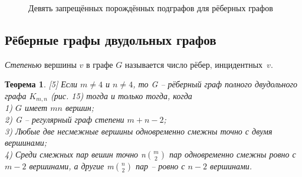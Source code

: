 \documentclass[12pt]{article}
\newtheorem{theorem}{\hspace{1cm}Теорема}
\begin{document}
\begin{figure}
	\label{pic12}
	\caption{Девять запрещённых порождённых подграфов для рёберных графов}
\end{figure}
 
\vspace{-5mm}

\begin{center}
	\subsection{Рёберные графы двудольных графов}
\end{center}

{\it Степенью} вершины $v$ в графе $G$ называется число рёбер, инцидентных~$v$.

\begin{theorem} \label{t8}[5]
	Если $m\ne4$ и $n\ne4$, то G -- рёберный граф полного двудольного графа $K_{m,n}$ (рис. 15) тогда и только тогда, когда 
	\\1) $G$ имеет $mn$ вершин;
	\\2) G -- регулярный граф степени $m+n-2$;
	\\3) Любые две несмежные вершины одновременно смежны точно с двумя вершинами;
	\\4) Среди смежных пар вешин точно n${m \choose 2}$ пар одновременно смежны ровно с $m-2$ вершинами, а другие m${n \choose 2}$ пар -- ровно с $n-2$ вершинами.
	
\end{theorem}
\end{document}
